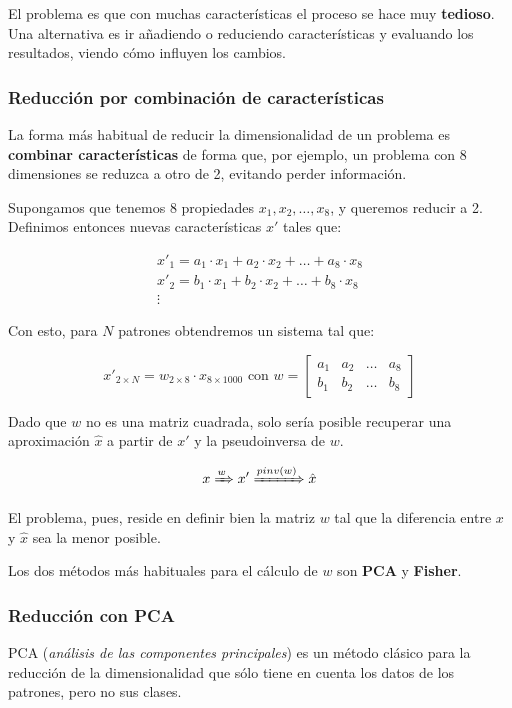 \documentclass[11pt]{scrartcl}
\begin{document}
El problema es que con muchas características el proceso se hace muy
\textbf{tedioso}. Una alternativa es ir añadiendo o reduciendo características y
evaluando los resultados, viendo cómo influyen los cambios.

\subsubsection{Reducción por combinación de características}

La forma más habitual de reducir la dimensionalidad de un problema es
\textbf{combinar características} de forma que, por ejemplo, un problema con 8
dimensiones se reduzca a otro de 2, evitando perder información.

Supongamos que tenemos 8 propiedades $x_1, x_2, \dots, x_8$, y queremos reducir
a 2. Definimos entonces nuevas características $x'$ tales que:

\begin{gather*}
x'_1 = a_1 \cdot x_1 + a_2 \cdot x_2 + \dots + a_8 \cdot x_8 \\  
x'_2 = b_1 \cdot x_1 + b_2 \cdot x_2 + \dots + b_8 \cdot x_8 \\
\vdots
\end{gather*}

Con esto, para $N$ patrones obtendremos un sistema tal que:

\[
x'_{2 \times N} = w_{2 \times 8} \cdot x_{8 \times 1000} \text{ con } w =
\begin{bmatrix}
a_1 & a_2 & \dots & a_8 \\
b_1 & b_2 & \dots & b_8
\end{bmatrix}
\]

Dado que $w$ no es una matriz cuadrada, solo sería posible recuperar una
aproximación $\hat{x}$ a partir de $x'$ y la pseudoinversa de $w$.

\[
x \xRightarrow[]{w} x' \xRightarrow[]{pinv(w)} \hat{x}
\]

El problema, pues, reside en definir bien la matriz $w$ tal que la diferencia
entre $x$ y $\hat{x}$ sea la menor posible.

Los dos métodos más habituales para el cálculo de $w$ son \textbf{PCA} y \textbf{Fisher}.

\subsubsection{Reducción con PCA}

PCA (\textit{análisis de las componentes principales}) es un método clásico para
la reducción de la dimensionalidad que sólo tiene en cuenta los datos de los
patrones, pero no sus clases.
\end{document}
